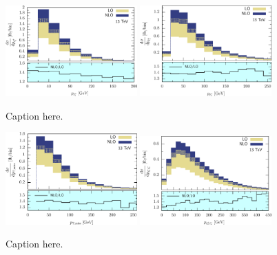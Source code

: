 \documentclass[preprint]{JHEP3} %
\begin{document}
\begin{figure}[h]
\centering %
\includegraphics[width=0.45\textwidth]{./LHC_53_Fig01.eps}
\hfill
\includegraphics[width=0.45\textwidth]{./LHC_53_Fig03.eps}
\caption{\label{fig:i} Caption here.}
\end{figure}


\begin{figure}[h]
\centering %
\includegraphics[width=0.45\textwidth]{./LHC_53_Fig08.eps}
\hfill
\includegraphics[width=0.45\textwidth]{./LHC_53_Fig12.eps}
\caption{\label{fig:i} Caption here.}
\end{figure}
\end{document}
